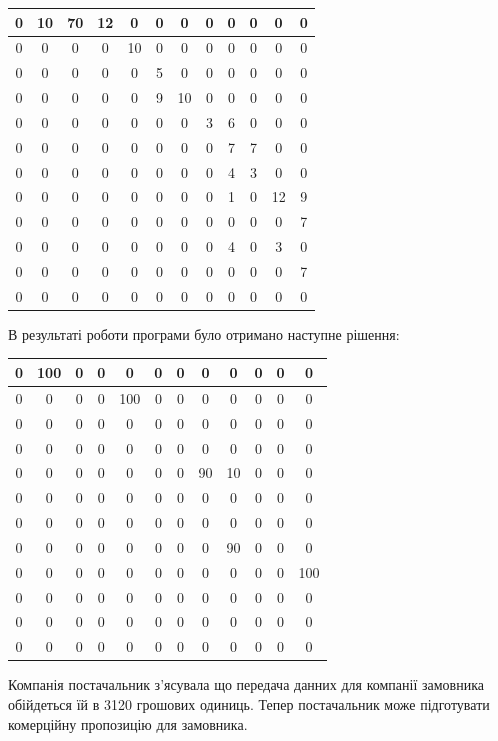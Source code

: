 \documentclass[a4paper,14pt,russian,ukrainian,oneside,final]{extreport}
\begin{document}
\begin{center}
\begin{tabular}{|c|c|c|c|c|c|c|c|c|c|c|c|}
\hline
0&10&70&12&0&0&0&0&0&0&0&0\\ \hline
0&0&0&0&10&0&0&0&0&0&0&0  \\ \hline
0&0&0&0&0&5&0&0&0&0&0&0   \\ \hline
0&0&0&0&0&9&10&0&0&0&0&0  \\ \hline
0&0&0&0&0&0&0&3&6&0&0&0   \\ \hline
0&0&0&0&0&0&0&0&7&7&0&0   \\ \hline
0&0&0&0&0&0&0&0&4&3&0&0   \\ \hline
0&0&0&0&0&0&0&0&1&0&12&9  \\ \hline
0&0&0&0&0&0&0&0&0&0&0&7   \\ \hline
0&0&0&0&0&0&0&0&4&0&3&0   \\ \hline
0&0&0&0&0&0&0&0&0&0&0&7   \\ \hline
0&0&0&0&0&0&0&0&0&0&0&0   \\ \hline
\end{tabular}
\end{center}

\indent В результаті роботи програми було отримано наступне рішення:
\begin{center}
\begin{tabular}{|c|c|c|c|c|c|c|c|c|c|c|c|}
\hline
0&100&0&0&0&0&0&0&0&0&0&0 \\ \hline
0&0&0&0&100&0&0&0&0&0&0&0 \\ \hline
0&0&0&0&0&0&0&0&0&0&0&0   \\ \hline
0&0&0&0&0&0&0&0&0&0&0&0   \\ \hline
0&0&0&0&0&0&0&90&10&0&0&0 \\ \hline
0&0&0&0&0&0&0&0&0&0&0&0   \\ \hline
0&0&0&0&0&0&0&0&0&0&0&0   \\ \hline
0&0&0&0&0&0&0&0&90&0&0&0  \\ \hline
0&0&0&0&0&0&0&0&0&0&0&100 \\ \hline
0&0&0&0&0&0&0&0&0&0&0&0   \\ \hline
0&0&0&0&0&0&0&0&0&0&0&0   \\ \hline
0&0&0&0&0&0&0&0&0&0&0&0   \\ \hline
\end{tabular}
\end{center}
Компанія постачальник з'ясувала що передача данних для компанії замовника обійдеться їй в 3120 грошових одиниць.
Тепер постачальник може підготувати комерційну пропозицію для замовника.
\end{document}
